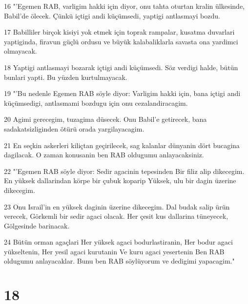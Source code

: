 \par 16 "'Egemen RAB, varligim hakki için diyor, onu tahta oturtan kralin ülkesinde, Babil'de ölecek. Çünkü içtigi andi küçümsedi, yaptigi antlasmayi bozdu.
\par 17 Babilliler birçok kisiyi yok etmek için toprak rampalar, kusatma duvarlari yaptiginda, firavun güçlü ordusu ve büyük kalabaliklarla savasta ona yardimci olmayacak.
\par 18 Yaptigi antlasmayi bozarak içtigi andi küçümsedi. Söz verdigi halde, bütün bunlari yapti. Bu yüzden kurtulmayacak.
\par 19 "'Bu nedenle Egemen RAB söyle diyor: Varligim hakki için, bana içtigi andi küçümsedigi, antlasmami bozdugu için onu cezalandiracagim.
\par 20 Agimi gerecegim, tuzagima düsecek. Onu Babil'e getirecek, bana sadakatsizliginden ötürü orada yargilayacagim.
\par 21 En seçkin askerleri kiliçtan geçirilecek, sag kalanlar dünyanin dört bucagina dagilacak. O zaman konusanin ben RAB oldugumu anlayacaksiniz.
\par 22 "'Egemen RAB söyle diyor: Sedir agacinin tepesinden Bir filiz alip dikecegim. En yüksek dallarindan körpe bir çubuk koparip Yüksek, ulu bir dagin üzerine dikecegim.
\par 23 Onu Israil'in en yüksek daginin üzerine dikecegim. Dal budak salip ürün verecek, Görkemli bir sedir agaci olacak. Her çesit kus dallarina tüneyecek, Gölgesinde barinacak.
\par 24 Bütün orman agaçlari Her yüksek agaci bodurlastiranin, Her bodur agaci yükseltenin, Her yesil agaci kurutanin Ve kuru agaci yesertenin Ben RAB oldugumu anlayacaklar. Bunu ben RAB söylüyorum ve dedigimi yapacagim."

\chapter{18}

